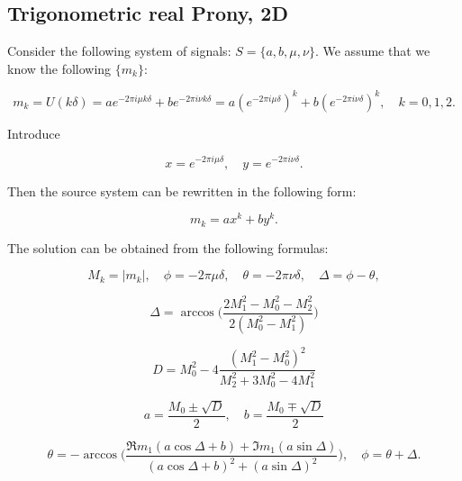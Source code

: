 \subsection{Trigonometric real Prony, 2D}

Consider the following system of signals: $S = \{ a, b, \mu, \nu \}$. We assume that we know the following $\{m_k\}$:

\begin{equation}
  \label{eq:TProny2D-mk}
  m_k = 
  U(k\delta) = 
  a e^{-2\pi i \mu k \delta} + b e^{-2\pi i \nu k \delta} =
  a (e^{-2\pi i \mu \delta})^k + b (e^{-2\pi i \nu \delta})^k, \quad
  k = 0, 1, 2.
\end{equation}

Introduce

$$
  x = e^{-2\pi i \mu \delta}, \quad 
  y = e^{-2\pi i \nu \delta}.
$$

Then the source system can be rewritten in the following form:

$$
  m_k = ax^k + by^k.
$$

The solution can be obtained from the following formulas:

$$
  M_k = |m_k|, \quad
  \phi = -2\pi \mu \delta, \quad
  \theta = -2\pi \nu \delta, \quad
  \Delta = \phi - \theta,
$$

$$
  \Delta = \arccos \Bigg( 
    \dfrac{2 M_1^2 - M_0^2 - M_2^2}{2(M_0^2 - M_1^2)} 
  \Bigg)
$$

$$
  D = M_0^2 - 4\dfrac{(M_1^2 - M_0^2)^2}{M_2^2 + 3M_0^2 - 4M_1^2}
$$

$$
  a = \dfrac{M_0 \pm \sqrt{D}}{2}, \quad 
  b = \dfrac{M_0 \mp \sqrt{D}}{2}
$$

$$
  \theta = -\arccos \Big( 
    \dfrac
      {\Re m_1 (a\cos\Delta + b) + \Im m_1 (a\sin\Delta)}
      {(a\cos\Delta + b)^2 + (a\sin\Delta)^2} 
  \Big), \quad
  \phi = \theta + \Delta.
$$

  
